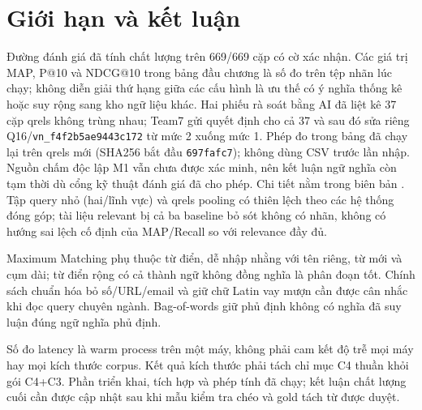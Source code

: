 \section{Giới hạn và kết luận}

Đường đánh giá đã tính chất lượng trên 669/669 cặp có cờ xác nhận. Các giá trị
MAP, P@10 và NDCG@10 trong bảng đầu chương là số đo trên tệp nhãn lúc chạy;
không diễn giải thứ hạng giữa các cấu hình là ưu thế có ý nghĩa thống kê hoặc
suy rộng sang kho ngữ liệu khác. Hai phiếu rà soát bằng AI đã liệt kê 37 cặp
qrels không trùng nhau; Team7 gửi quyết định cho cả 37 và sau đó sửa riêng
Q16/\texttt{vn\_f4f2b5ae9443c172} từ mức 2 xuống mức 1. Phép đo trong bảng
đã chạy lại trên qrels mới (SHA256 bắt đầu \texttt{697fafc7}); không dùng
CSV trước lần nhập. Nguồn chấm độc lập M1 vẫn chưa được xác minh, nên kết luận
ngữ nghĩa còn tạm thời dù cổng kỹ thuật đánh giá đã cho phép. Chi tiết nằm
trong biên bản .
Tập query nhỏ (hai/lĩnh vực) và qrels pooling có thiên lệch theo các hệ thống
đóng góp; tài liệu relevant bị cả ba baseline bỏ sót không có nhãn, không có
hướng sai lệch cố định của MAP/Recall so với relevance đầy đủ.

Maximum Matching phụ thuộc từ điển, dễ nhập nhằng với tên riêng, từ mới và cụm
dài; từ điển rộng có cả thành ngữ không đồng nghĩa là phân đoạn tốt. Chính sách
chuẩn hóa bỏ số/URL/email và giữ chữ Latin vay mượn cần được cân nhắc khi đọc
query chuyên ngành. Bag-of-words giữ phủ định không có nghĩa đã suy luận đúng
ngữ nghĩa phủ định.

Số đo latency là warm process trên một máy, không phải cam kết độ trễ mọi máy
hay mọi kích thước corpus. Kết quả kích thước phải tách chỉ mục C4 thuần khỏi gói
C4+C3. Phần triển khai, tích hợp và phép tính đã chạy; kết luận chất lượng cuối
cần được cập nhật sau khi mẫu kiểm tra chéo và gold tách từ được duyệt.
